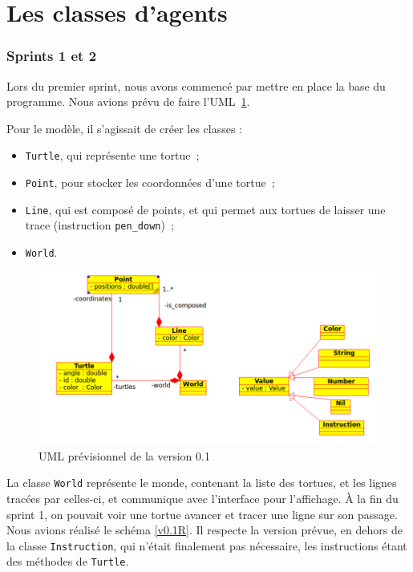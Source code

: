 \section{Les classes d'agents}
\subsubsection{Sprints 1 et 2}
Lors du premier sprint, nous avons commencé par mettre en place la base du programme. Nous avions prévu de faire l'UML~\ref{v0.1}.

 Pour le modèle, il s'agissait de créer les classes :
\begin{itemize}
\item \verb|Turtle|, qui représente une tortue~;
\item \verb|Point|, pour stocker les coordonnées d'une tortue~;
\item \verb|Line|, qui est composé de points, et qui permet aux tortues de laisser une trace (instruction \verb|pen_down|)~;
\item \verb|World|.
\end{itemize}


\begin{figure}[h]
\centering
\includegraphics[scale=0.5]{doc/report/uml/v01.png}
\caption{\label{v0.1} UML prévisionnel de la version 0.1}
\end{figure}


La classe \verb|World| représente le monde, contenant la liste des tortues, et les lignes tracées par celles-ci, et communique avec l'interface pour l'affichage.
À la fin du sprint 1, on pouvait voir une tortue avancer et tracer une ligne sur son passage.
Nous avions réalisé le schéma \ref{v0.1R}. Il respecte la version prévue, en dehors de la classe \verb|Instruction|, qui n'était finalement pas nécessaire, les instructions étant des méthodes de \verb|Turtle|.

